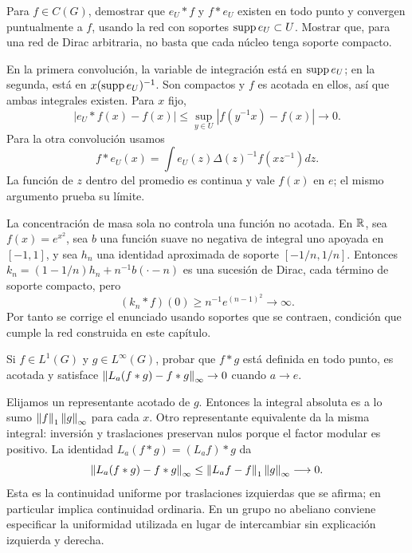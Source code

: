 \begin{ejercicio}\label{ej:v4-l22-3}
Para $f\in C(G)$, demostrar que $e_U*f$ y $f*e_U$ existen en todo punto y convergen puntualmente a $f$, usando la red con soportes $\operatorname{supp} e_U\subset U$. Mostrar que, para una red de Dirac arbitraria, no basta que cada núcleo tenga soporte compacto.
\end{ejercicio}
\begin{solucion}
En la primera convolución, la variable de integración está en $\operatorname{supp} e_U$; en la segunda, está en $x(\operatorname{supp} e_U)^{-1}$. Son compactos y $f$ es acotada en ellos, así que ambas integrales existen. Para $x$ fijo,
\[
 |e_U*f(x)-f(x)|\leq\sup_{y\in U}|f(y^{-1}x)-f(x)|\longrightarrow0.
\]
Para la otra convolución usamos
\[
 f*e_U(x)=\int e_U(z)\Delta(z)^{-1}f(xz^{-1})dz.
\]
La función de $z$ dentro del promedio es continua y vale $f(x)$ en $e$; el mismo argumento prueba su límite.

La concentración de masa sola no controla una función no acotada. En $\mathbb R$, sea $f(x)=e^{x^2}$, sea $b$ una función suave no negativa de integral uno apoyada en $[-1,1]$, y sea $h_n$ una identidad aproximada de soporte $[-1/n,1/n]$. Entonces $k_n=(1-1/n)h_n+n^{-1}b(\cdot-n)$ es una sucesión de Dirac, cada término de soporte compacto, pero
\[
 (k_n*f)(0)\geq n^{-1}e^{(n-1)^2}\longrightarrow\infty.
\]
Por tanto se corrige el enunciado usando soportes que se contraen, condición que cumple la red construida en este capítulo.
\end{solucion}

\begin{ejercicio}\label{ej:v4-l22-4}
Si $f\in L^1(G)$ y $g\in L^\infty(G)$, probar que $f*g$ está definida en todo punto, es acotada y satisface $\left\lVert L_a(f*g)-f*g\right\rVert_\infty\to0$ cuando $a\to e$.
\end{ejercicio}
\begin{solucion}
Elijamos un representante acotado de $g$. Entonces la integral absoluta es a lo sumo $\left\lVert f\right\rVert_1\left\lVert g\right\rVert_\infty$ para cada $x$. Otro representante equivalente da la misma integral: inversión y traslaciones preservan nulos porque el factor modular es positivo. La identidad $L_a(f*g)=(L_af)*g$ da
\[
 \left\lVert L_a(f*g)-f*g\right\rVert_\infty\leq\left\lVert L_af-f\right\rVert_1\left\lVert g\right\rVert_\infty\longrightarrow0.
\]
Esta es la continuidad uniforme por traslaciones izquierdas que se afirma; en particular implica continuidad ordinaria. En un grupo no abeliano conviene especificar la uniformidad utilizada en lugar de intercambiar sin explicación izquierda y derecha.
\end{solucion}


